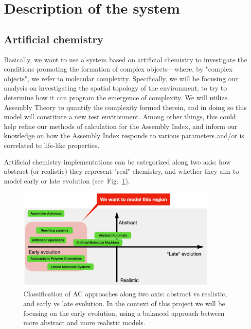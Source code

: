 \documentclass[11pt]{article}
\begin{document}
\tableofcontents
\clearpage

\section{Description of the system}

\subsection{Artificial chemistry}

Basically, we want to use a system based on artificial chemistry to investigate the conditions promoting the formation of complex objects---where, by "complex objects", we refer to molecular complexity. Specifically, we will be focusing our analysis on investigating the spatial topology of the environment, to try to determine how it can program the emergence of complexity. We will utilize Assembly Theory to quantify the complexity formed therein, and in doing so this model will constitute a new test environment. Among other things, this could help refine our methods of calculation for the Assembly Index, and inform our knowledge on how the Assembly Index responds to various parameters and/or is correlated to life-like properties.

Artificial chemistry implementations can be categorized along two axis: how abstract (or realistic) they represent "real" chemistry, and whether they aim to model early or late evolution (see~Fig.~\ref{fig:abstraction-stage}).

\begin{figure}[h]
  \centering
  \includegraphics[width=0.90\textwidth]{figures/system/abstraction-stage.pdf}
  \caption{Classification of AC approaches along two axis: abstract vs realistic, and early vs late evolution. In the context of this project we will be focusing on the early evolution, using a balanced approach between more abstract and more realistic models.}
  \label{fig:abstraction-stage}
\end{figure}
\end{document}
